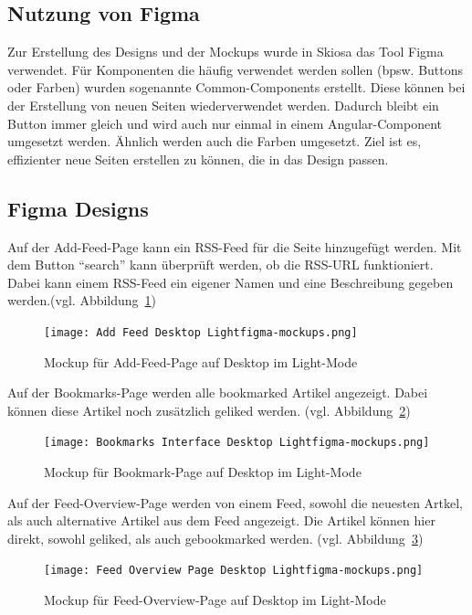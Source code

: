 \subsection{Nutzung von Figma}

Zur Erstellung des Designs und der Mockups wurde in Skiosa das Tool Figma verwendet. 
Für Komponenten die häufig verwendet werden sollen (bpsw. Buttons oder Farben) wurden sogenannte Common-Components erstellt.
Diese können bei der Erstellung von neuen Seiten wiederverwendet werden. 
Dadurch bleibt ein Button immer gleich und wird auch nur einmal in einem Angular-Component umgesetzt werden.
Ähnlich werden auch die Farben umgesetzt. 
Ziel ist es, effizienter neue Seiten erstellen zu können, die in das Design passen.

\subsection{Figma Designs}

Auf der Add-Feed-Page kann ein RSS-Feed für die Seite hinzugefügt werden. Mit dem Button \enquote{search} kann überprüft werden, ob die RSS-URL funktioniert.
Dabei kann einem RSS-Feed ein eigener Namen und eine Beschreibung gegeben werden.(vgl. Abbildung~\ref{fig:Add Feed Desktop Light}) 
\begin{figure}[H]
    \texttt{[image: Add Feed Desktop Lightfigma-mockups.png]}
    \caption{Mockup für Add-Feed-Page auf Desktop im Light-Mode}
    \label{fig:Add Feed Desktop Light}
\end{figure}

Auf der Bookmarks-Page werden alle bookmarked Artikel angezeigt.
Dabei können diese Artikel noch zusätzlich geliked werden. (vgl. Abbildung~\ref{fig:Bookmarks Interface Desktop Light})

\begin{figure}[H]
    \texttt{[image: Bookmarks Interface Desktop Lightfigma-mockups.png]}
    \caption{Mockup für Bookmark-Page auf Desktop im Light-Mode}
    \label{fig:Bookmarks Interface Desktop Light}
\end{figure}

Auf der Feed-Overview-Page werden von einem Feed, sowohl die neuesten Artkel, als auch alternative Artikel aus dem Feed angezeigt.
Die Artikel können hier direkt, sowohl geliked, als auch gebookmarked werden. (vgl. Abbildung~\ref{fig:Feed Overview Page Light Desktop})

\begin{figure}[H]
    \texttt{[image: Feed Overview Page Desktop Lightfigma-mockups.png]}
    \caption{Mockup für Feed-Overview-Page auf Desktop im Light-Mode}
    \label{fig:Feed Overview Page Light Desktop}
\end{figure}

